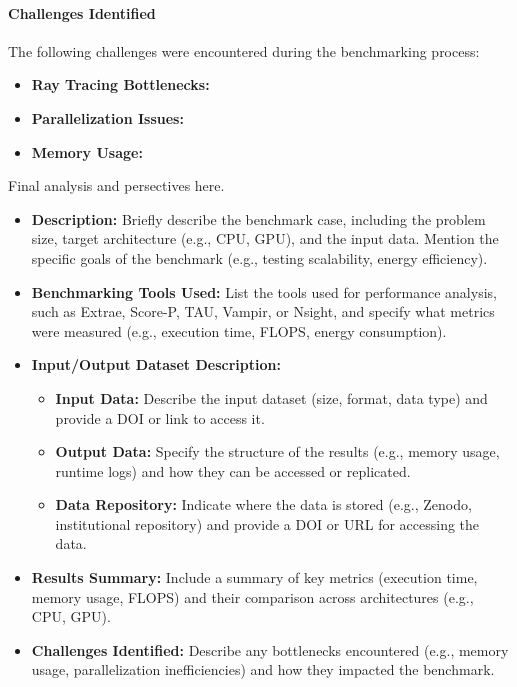 \paragraph{Challenges Identified}
The following challenges were encountered during the benchmarking process:
\begin{itemize}
    \item \textbf{Ray Tracing Bottlenecks:}
    \item \textbf{Parallelization Issues:}
    \item \textbf{Memory Usage:}
\end{itemize}

Final analysis and persectives here.

\begin{itemize}
    \item \textbf{Description:} Briefly describe the benchmark case, including the problem size, target architecture (e.g., CPU, GPU), and the input data. Mention the specific goals of the benchmark (e.g., testing scalability, energy efficiency).
    \item \textbf{Benchmarking Tools Used:} List the tools used for performance analysis, such as Extrae, Score-P, TAU, Vampir, or Nsight, and specify what metrics were measured (e.g., execution time, FLOPS, energy consumption).
    \item \textbf{Input/Output Dataset Description:}
        \begin{itemize}
            \item \textbf{Input Data:} Describe the input dataset (size, format, data type) and provide a DOI or link to access it.
            \item \textbf{Output Data:} Specify the structure of the results (e.g., memory usage, runtime logs) and how they can be accessed or replicated.
            \item \textbf{Data Repository:} Indicate where the data is stored (e.g., Zenodo, institutional repository) and provide a DOI or URL for accessing the data.
        \end{itemize}
    \item \textbf{Results Summary:} Include a summary of key metrics (execution time, memory usage, FLOPS) and their comparison across architectures (e.g., CPU, GPU).
    \item \textbf{Challenges Identified:} Describe any bottlenecks encountered (e.g., memory usage, parallelization inefficiencies) and how they impacted the benchmark.
\end{itemize}

